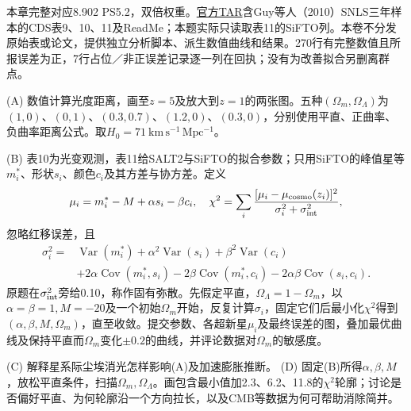 本章完整对应8.902 PS5.2，双倍权重。\href{https://ocw.mit.edu/courses/8-902-astrophysics-ii-fall-2023/mit8_902_f23_problem_set_5_additional_files.tar}{官方TAR}含Guy等人（2010）SNLS三年样本的CDS表9、10、11及ReadMe；本题实际只读取表11的SiFTO列。本卷不分发原始表或论文，提供独立分析脚本、派生数值曲线和结果。270行有完整数值且所报误差为正，7行占位／非正误差记录逐一列在回执；没有为改善拟合另删离群点。

\begin{exercise}
(A) 数值计算光度距离，画至$z=5$及放大到$z=1$的两张图。五种$(\Omega_m,\Omega_\Lambda)$为$(1,0)$、$(0,1)$、$(0.3,0.7)$、$(1.2,0)$、$(0.3,0)$，分别使用平直、正曲率、负曲率距离公式。取$H_0=71\ \mathrm{km\,s^{-1}\,Mpc^{-1}}$。

(B) 表10为光变观测，表11给SALT2与SiFTO的拟合参数；只用SiFTO的峰值星等$m_i^*$、形状$s_i$、颜色$c_i$及其方差与协方差。定义
\[
 \mu_i=m_i^*-M+\alpha s_i-\beta c_i,\quad
 \chi^2=\sum_i\frac{[\mu_i-\mu_{ \rm cosmo}(z_i)]^2}{\sigma_i^2+\sigma_{ \rm int}^2},
\]
忽略红移误差，且
\begin{align*}
 \sigma_i^2={}&\operatorname{Var}(m_i^*)+\alpha^2\operatorname{Var}(s_i)
 +\beta^2\operatorname{Var}(c_i)\\
 &+2\alpha\operatorname{Cov}(m_i^*,s_i)-2\beta\operatorname{Cov}(m_i^*,c_i)
 -2\alpha\beta\operatorname{Cov}(s_i,c_i).
\end{align*}
原题在$\sigma_{ \rm int}^2$旁给0.10，称作固有弥散。先假定平直，$\Omega_\Lambda=1-\Omega_m$，以$\alpha=\beta=1,M=-20$及一个初始$\Omega_m$开始，反复计算$\sigma_i$，固定它们后最小化$\chi^2$得到$(\alpha,\beta,M,\Omega_m)$，直至收敛。提交参数、各超新星$\mu_i$及最终误差的图，叠加最优曲线及保持平直而$\Omega_m$变化$\pm0.2$的曲线，并评论数据对$\Omega_m$的敏感度。

(C) 解释星系际尘埃消光怎样影响(A)及加速膨胀推断。
(D) 固定(B)所得$\alpha,\beta,M$，放松平直条件，扫描$\Omega_m,\Omega_\Lambda$。画包含最小值加2.3、6.2、11.8的$\chi^2$轮廓；讨论是否偏好平直、为何轮廓沿一个方向拉长，以及CMB等数据为何可帮助消除简并。
\end{exercise}
